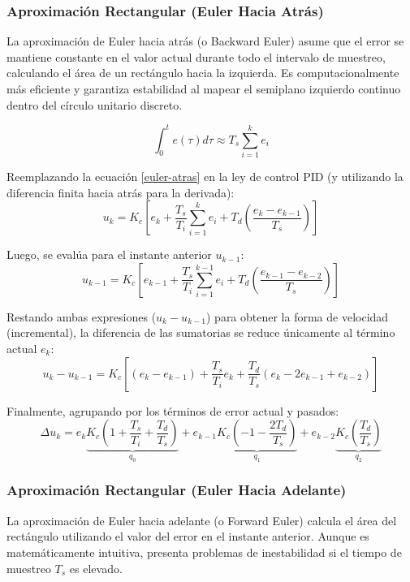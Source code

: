 \subsubsection{Aproximación Rectangular (Euler Hacia Atrás)}
La aproximación de Euler hacia atrás (o Backward Euler) asume que el error se mantiene constante en el valor actual durante todo el intervalo de muestreo, calculando el área de un rectángulo hacia la izquierda. Es computacionalmente más eficiente y garantiza estabilidad al mapear el semiplano izquierdo continuo dentro del círculo unitario discreto.


\begin{equation}
  \int_{0}^{t} e(\tau) d\tau \approx T_s\sum_{i=1}^{k} e_i
  \label{euler-atras}
\end{equation}

Reemplazando la ecuación \ref{euler-atras} en la ley de control PID (y utilizando la diferencia finita hacia atrás para la derivada):
\[
  u_k = K_c \left[ e_k + \frac{T_s}{T_i}\sum_{i=1}^{k}e_i + T_d\left(\frac{e_k - e_{k-1}}{T_s}\right) \right]
\]

Luego, se evalúa para el instante anterior $u_{k-1}$:
\[
  u_{k-1} = K_c \left[ e_{k-1} + \frac{T_s}{T_i}\sum_{i=1}^{k-1}e_i + T_d\left(\frac{e_{k-1} - e_{k-2}}{T_s}\right) \right]
\]

Restando ambas expresiones ($u_k - u_{k-1}$) para obtener la forma de velocidad (incremental), la diferencia de las sumatorias se reduce únicamente al término actual $e_k$:
\[
  u_k - u_{k-1} = K_c \left[ (e_k - e_{k-1}) + \frac{T_s}{T_i}e_k + \frac{T_d}{T_s}(e_k - 2e_{k-1} + e_{k-2}) \right]
\]

Finalmente, agrupando por los términos de error actual y pasados:
\begin{equation}
  \Delta u_k = e_k\underbrace{K_c\left(1 + \frac{T_s}{T_i} + \frac{T_d}{T_s}\right)}_{q_0} + e_{k-1}\underbrace{K_c\left(-1 - \frac{2T_d}{T_s}\right)}_{q_1} + e_{k-2}\underbrace{K_c\left(\frac{T_d}{T_s}\right)}_{q_2}
  \label{PID-euler-atras-final}
\end{equation}

\vspace{1cm}

\subsubsection{Aproximación Rectangular (Euler Hacia Adelante)}
La aproximación de Euler hacia adelante (o Forward Euler) calcula el área del rectángulo utilizando el valor del error en el instante anterior. Aunque es matemáticamente intuitiva, presenta problemas de inestabilidad si el tiempo de muestreo $T_s$ es elevado.

